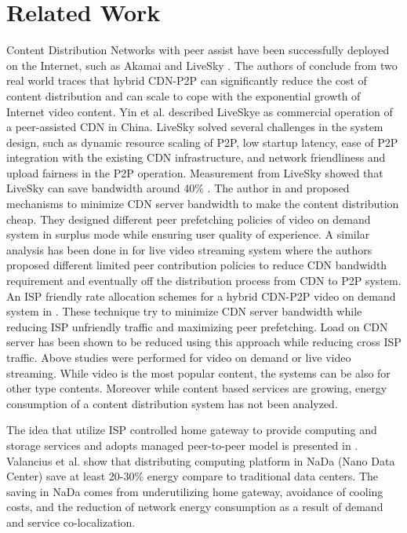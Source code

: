 \documentclass[JIP]{ipsj}
\begin{document}
\section{Related Work} 

Content Distribution Networks with peer assist have been successfully deployed on the Internet, such as Akamai \cite{Huang:2008:UHC:1496046.1496064} and LiveSky \cite{Yin:2010:LEC:1823746.1823750}.  
The authors of \cite{Huang:2008:UHC:1496046.1496064} conclude from two real world traces that hybrid CDN-P2P can significantly reduce the cost of content distribution and can scale to cope with the exponential growth of Internet video content.  
Yin et al. \cite{Yin:2010:LEC:1823746.1823750} described LiveSkye as commercial operation of a peer-assisted CDN in China.  
LiveSky solved several challenges in the system design, such as dynamic resource scaling of P2P, low startup latency, ease of P2P integration with the existing CDN infrastructure, and network friendliness and upload fairness in the P2P operation.  
Measurement from LiveSky showed that LiveSky can save bandwidth around 40\% \cite{Yin:2010:LEC:1823746.1823750}.
The author in \cite{Huang:2007:IVP:1282427.1282396} and \cite{huang2007peer} proposed mechanisms to minimize CDN server bandwidth to make the content distribution cheap.
They designed different peer prefetching policies of video on demand system in surplus mode while ensuring user quality of experience.
A similar analysis has been done in \cite{xu2006analysis} for live video streaming system where the authors proposed different limited peer contribution policies to reduce CDN bandwidth requirement and eventually off the distribution process from CDN to P2P system. 
An ISP friendly rate allocation schemes for a hybrid CDN-P2P video on demand system in \cite{Wang:2008:IRA:1459359.1459397}. 
These technique try to minimize CDN server bandwidth while reducing ISP unfriendly traffic and maximizing peer prefetching.
Load on CDN server has been shown to be reduced using this approach while reducing cross ISP traffic.
Above studies were performed for video on demand or live video streaming.
While video is the most popular content, the systems can be also for other type contents.
Moreover while content based services are growing, energy consumption of a content distribution system has not been analyzed.

The idea that utilize ISP controlled home gateway to provide computing and storage services and adopts managed peer-to-peer model is presented in \cite{valancius2009greening}. 
Valancius et al. \cite{valancius2009greening} show that distributing computing platform in NaDa (Nano Data Center) save at least 20-30\% energy compare to traditional data centers.
The saving in NaDa comes from underutilizing home gateway, avoidance of cooling costs, and the reduction of network energy consumption as a result of demand and service co-localization.
\end{document}
